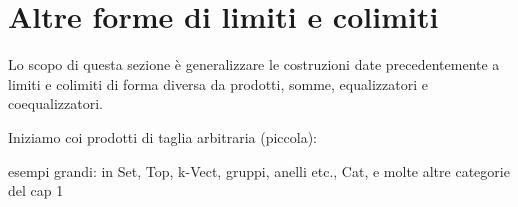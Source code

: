 


\begin{esercizi}
	\item
	\item
	\item
	\item
	\item
\end{esercizi}
\section{Altre forme di limiti e colimiti}
Lo scopo di questa sezione è generalizzare le costruzioni date precedentemente a limiti e colimiti di forma diversa da prodotti, somme, equalizzatori e coequalizzatori.

Iniziamo coi prodotti di taglia arbitraria (piccola):

esempi grandi: in Set, Top, k-Vect, gruppi, anelli etc., Cat, e molte altre categorie del cap 1

